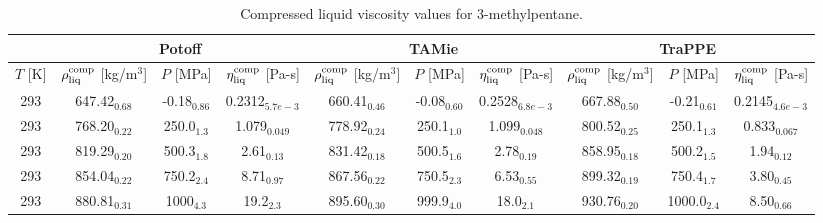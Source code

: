 \documentclass[preprint,review,12pt]{elsarticle}
\begin{document}
	\begin{table}[H]
		\caption{Compressed liquid viscosity values for 3-methylpentane.}
		\begin{center}
			\begin{tabular}{|c|c|c|c|c|c|c|c|c|c|}
				\hline
				& \multicolumn{3}{c|}{Potoff}                                                                          & \multicolumn{3}{c|}{TAMie}                                                                              & \multicolumn{3}{c|}{TraPPE}                                                                          \\ \hline
				$T$ {[}K{]} & $\rho^{\rm comp}_{\rm liq}$ {[}kg/m$^3${]} & $P$ {[}MPa{]}  & $\eta^{\rm comp}_{\rm liq}$ {[}Pa-s{]} & $\rho^{\rm comp}_{\rm liq}$ {[}kg/m$^3${]} & $P$ {[}MPa{]}     & $\eta^{\rm comp}_{\rm liq}$ {[}Pa-s{]} & $\rho^{\rm comp}_{\rm liq}$ {[}kg/m$^3${]} & $P$ {[}MPa{]}  & $\eta^{\rm comp}_{\rm liq}$ {[}Pa-s{]} \\ \hline
				293         & 647.42$_{0.68}$                            & -0.18$_{0.86}$ & 0.2312$_{5.7e-3}$                      & 660.41$_{0.46}$                         & -0.08$_{0.60}$ & 0.2528$_{6.8e-3}$                      & 667.88$_{0.50}$                         & -0.21$_{0.61}$ & 0.2145$_{4.6e-3}$                      \\ \hline
				293         & 768.20$_{0.22}$                            & 250.0$_{1.3}$  & 1.079$_{0.049}$                        & 778.92$_{0.24}$                         & 250.1$_{1.0}$  & 1.099$_{0.048}$                        & 800.52$_{0.25}$                         & 250.1$_{1.3}$  & 0.833$_{0.067}$                        \\ \hline
				293         & 819.29$_{0.20}$                            & 500.3$_{1.8}$  & 2.61$_{0.13}$                          & 831.42$_{0.18}$                         & 500.5$_{1.6}$  & 2.78$_{0.19}$                          & 858.95$_{0.18}$                         & 500.2$_{1.5}$  & 1.94$_{0.12}$                          \\ \hline
				293         & 854.04$_{0.22}$                            & 750.2$_{2.4}$  & 8.71$_{0.97}$                          & 867.56$_{0.22}$                         & 750.5$_{2.3}$  & 6.53$_{0.55}$                          & 899.32$_{0.19}$                         & 750.4$_{1.7}$  & 3.80$_{0.45}$                          \\ \hline
				293         & 880.81$_{0.31}$                            & 1000$_{4.3}$   & 19.2$_{2.3}$                           & 895.60$_{0.30}$                         & 999.9$_{4.0}$  & 18.0$_{2.1}$                           & 930.76$_{0.20}$                         & 1000.0$_{2.4}$ & 8.50$_{0.66}$                          \\ \hline
			\end{tabular}
		\end{center}
	\end{table}
\end{document}
